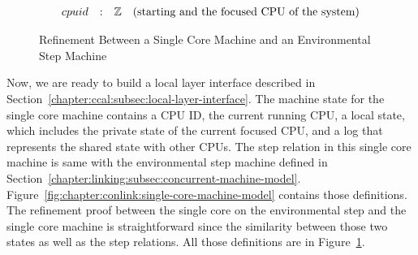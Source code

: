 \begin{figure}
\noindent{}
$$
\begin{array}{lllr}
cpuid & : & \ztype &  \mbox{(starting and the focused CPU of the system)}\\
\end{array}
$$

\noindent{}
\begin{mathpar}
\end{mathpar}

\caption{Refinement Between a Single Core Machine and an Environmental Step Machine}
\label{fig:chapter:conlink:cpu-single-to-env-theorem}
\end{figure}


Now, we are ready to build a local layer interface described in Section~\ref{chapter:ccal:subsec:local-layer-interface}. 
The machine state for the single core machine contains 
a CPU ID, the current running CPU, 
a local state, which includes the private state of the current focused CPU,
and a log that represents the shared state with other CPUs. 
The step relation in this single core machine is same with the environmental step machine defined in Section~\ref{chapter:linking:subsec:concurrent-machine-model}. Figure~\ref{fig:chapter:conlink:single-core-machine-model} contains those definitions. 
The refinement proof between the single core on the environmental step and the single core machine is straightforward since the similarity between
those two states as well as the step relations.
All those definitions are in Figure~\ref{fig:chapter:conlink:cpu-single-to-env-theorem}.

